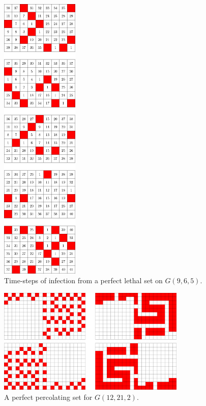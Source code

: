 \begin{figure}[H]
\centering
\includegraphics[width=0.33\textwidth]{figures/A/6x9x5_numbered_heatmap.pdf}
\caption{Time-steps of infection from a perfect lethal set on $G(9,6,5)$.}
\label{fig:6x9x5_numbered_heatmap}
\end{figure}

\newpage


\begin{figure}[H]
\centering
\includegraphics[width=0.8\textwidth]{figures/7/12x21x2.pdf}
\caption{A perfect percolating set for $G(12,21,2)$.}
\label{fig:12x21x2}
\end{figure} 

